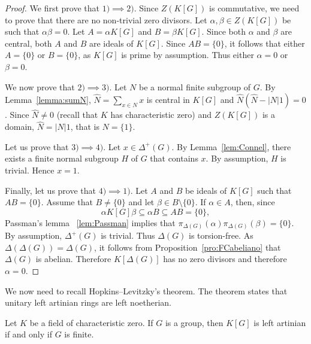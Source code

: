 \begin{proof}
	We first prove that $1)\implies2)$. Since $Z(K[G])$ is commutative, we need to prove that 
	there are no non-trivial zero divisors. Let $\alpha,\beta\in Z(K[G])$ be such that 
	$\alpha\beta=0$. Let $A=\alpha K[G]$ and $B=\beta K[G]$. Since both $\alpha$ and 
	$\beta$ are central, both $A$ and $B$ are ideals of $K[G]$. Since $AB=\{0\}$,
	it follows that either $A=\{0\}$ or $B=\{0\}$, as $K[G]$ is prime by assumption. 
	Thus either $\alpha=0$ or 
	$\beta=0$.

	We now prove that $2)\implies3)$. Let $N$ be a normal finite subgroup of $G$. 
	By Lemma~\ref{lemma:sumN}, $\widehat{N}=\sum_{x\in N}x$ is central in 
	$K[G]$ and $\widehat{N}(\widehat{N}-|N|1)=0$. Since $\widehat{N}\ne 0$ (recall that 
	$K$ has characteristic zero) and $Z(K[G])$ is a domain,
	$\widehat{N}=|N|1$, that is $N=\{1\}$.

	Let us prove that $3)\implies4)$. Let $x\in\Delta^+(G)$. By Lemma~\ref{lem:Connel},
	there exists a finite normal subgroup $H$ of $G$ that contains $x$. By assumption, $H$ is trivial. 
	Hence $x=1$.

	Finally, let us prove that $4)\implies1)$. Let $A$ and $B$ be ideals of 
	$K[G]$ such that $AB=\{0\}$. Assume that $B\ne\{ 0\}$ and let $\beta\in
	B\setminus\{0\}$.  If $\alpha\in A$, then, since 
	\[
	\alpha K[G]\beta\subseteq \alpha B\subseteq AB=\{0\},
	\]
	Passman's lemma ~\ref{lem:Passman}
	implies that $\pi_{\Delta(G)}(\alpha)\pi_{\Delta(G)}(\beta)=\{0\}$.
	By assumption, $\Delta^+(G)$ is trivial. 
	Thus $\Delta(G)$ is torsion-free. 
	As $\Delta(\Delta(G))=\Delta(G)$, it follows from 
	Proposition~\ref{pro:FCabeliano} that  
	$\Delta(G)$ is abelian. Therefore 
	$K[\Delta(G)]$ has no zero divisors and therefore $\alpha=0$. 
\end{proof}

We now need to recall Hopkins--Levitzky's theorem. The theorem
states that unitary left artinian rings are left noetherian.

\begin{theorem}[Connel]
	Let $K$ be a field of characteristic zero. If $G$ is a group, then 
	$K[G]$ is left artinian if and only if $G$ is finite.
\end{theorem}

